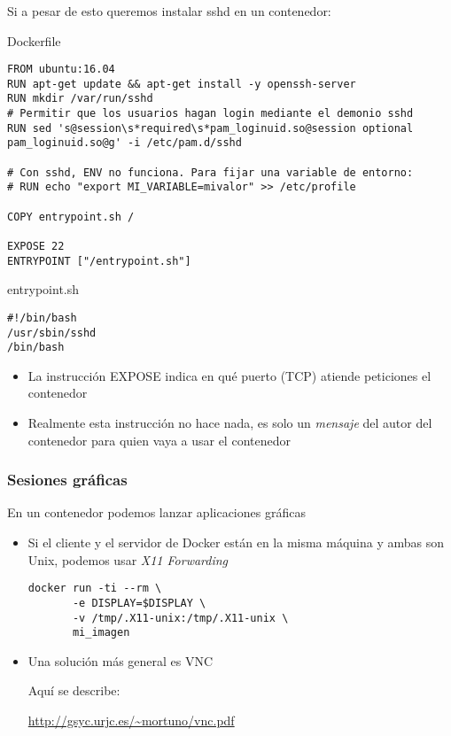 \documentclass[ucs]{beamer}
\begin{document}
\begin{frame}[fragile]
\frametitle{}

Si a pesar de esto queremos instalar sshd en un contenedor:

Dockerfile 
  \begin{tiny}
  \begin{verbatim}
FROM ubuntu:16.04
RUN apt-get update && apt-get install -y openssh-server
RUN mkdir /var/run/sshd
# Permitir que los usuarios hagan login mediante el demonio sshd
RUN sed 's@session\s*required\s*pam_loginuid.so@session optional pam_loginuid.so@g' -i /etc/pam.d/sshd

# Con sshd, ENV no funciona. Para fijar una variable de entorno:
# RUN echo "export MI_VARIABLE=mivalor" >> /etc/profile

COPY entrypoint.sh /

EXPOSE 22
ENTRYPOINT ["/entrypoint.sh"]
  \end{verbatim}
  \end{tiny}

entrypoint.sh
  \begin{scriptsize}
  \begin{verbatim}
#!/bin/bash
/usr/sbin/sshd 
/bin/bash
  \end{verbatim}
  \end{scriptsize}


\begin{itemize}
\item
La instrucción EXPOSE indica en qué puerto (TCP) atiende peticiones el contenedor
\item
Realmente esta instrucción no hace nada, es solo un \emph{mensaje} del autor 
del contenedor para quien vaya a usar el contenedor
\end{itemize}

\end{frame}



\begin{frame}[fragile]
\frametitle{Sesiones gráficas}
En un contenedor podemos lanzar aplicaciones gráficas
\begin{itemize}
\item
Si el cliente y el servidor de Docker están en la misma máquina y ambas son
Unix, podemos usar \emph{X11 Forwarding}

  \begin{scriptsize}
  \begin{verbatim}
docker run -ti --rm \
       -e DISPLAY=$DISPLAY \
       -v /tmp/.X11-unix:/tmp/.X11-unix \
       mi_imagen
  \end{verbatim}
  \end{scriptsize}
\item
Una solución más general es VNC

Aquí se describe:

\url{http://gsyc.urjc.es/~mortuno/vnc.pdf}


\end{itemize}

\end{frame}




\end{document}
